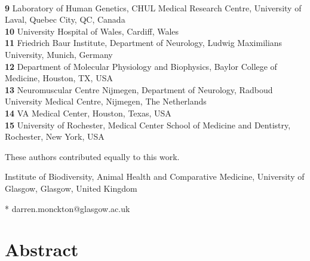 \documentclass[10pt,letterpaper]{article}
\begin{document}
\begin{flushleft}
\\
\textbf{9} Laboratory of Human Genetics, CHUL Medical Research Centre, University of Laval, Quebec City, QC, Canada
\\
\textbf{10} University Hospital of Wales, Cardiff, Wales
\\
\textbf{11} Friedrich Baur Institute, Department of Neurology, Ludwig Maximilians University, Munich, Germany
\\
\textbf{12} Department of Molecular Physiology and Biophysics, Baylor College of Medicine, Houston, TX, USA
\\
\textbf{13} Neuromuscular Centre Nijmegen, Department of Neurology, Radboud University Medical Centre, Nijmegen, The Netherlands
\\
\textbf{14} VA Medical Center, Houston, Texas, USA
\\
\textbf{15} University of Rochester, Medical Center
School of Medicine and Dentistry, Rochester, New York, USA
\bigskip

% 
%
\Yinyang These authors contributed equally to this work.


\textcurrency Institute of Biodiversity, Animal Health and Comparative Medicine, University of Glasgow, Glasgow, United Kingdom %



* darren.monckton@glasgow.ac.uk

\end{flushleft}
\section*{Abstract}
\end{document}
